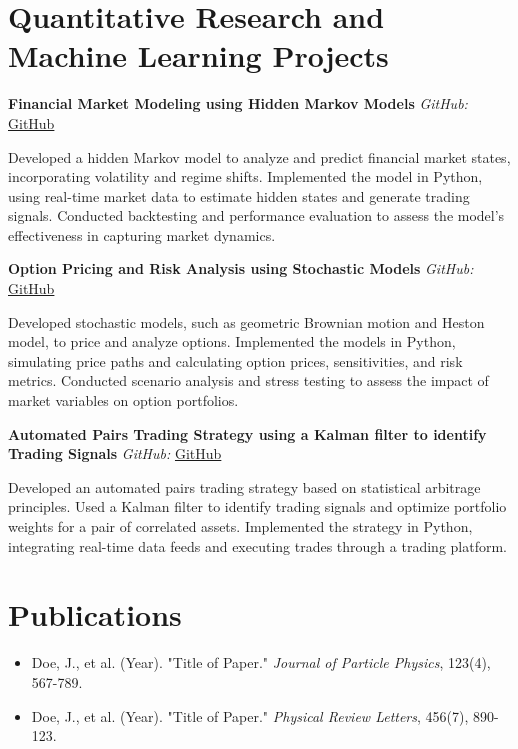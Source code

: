\documentclass[a4paper,10pt]{article}
\begin{document}
\section*{Quantitative Research and Machine Learning Projects}
\textbf{Financial Market Modeling using Hidden Markov Models} \hfill \textit{GitHub:} \href{https://github.com/johndoe/project1}{GitHub}

Developed a hidden Markov model to analyze and predict financial market states, incorporating volatility and regime shifts. Implemented the model in Python, using real-time market data to estimate hidden states and generate trading signals. Conducted backtesting and performance evaluation to assess the model's effectiveness in capturing market dynamics.

\textbf{Option Pricing and Risk Analysis using Stochastic Models} \hfill \textit{GitHub:} \href{https://github.com/johndoe/project2}{GitHub}

Developed stochastic models, such as geometric Brownian motion and Heston model, to price and analyze options. Implemented the models in Python, simulating price paths and calculating option prices, sensitivities, and risk metrics. Conducted scenario analysis and stress testing to assess the impact of market variables on option portfolios.

\textbf{Automated Pairs Trading Strategy using a Kalman filter to identify Trading Signals} \hfill \textit{GitHub:} \href{https://github.com/johndoe/project3}{GitHub}

Developed an automated pairs trading strategy based on statistical arbitrage principles. Used a Kalman filter to identify trading signals and optimize portfolio weights for a pair of correlated assets. Implemented the strategy in Python, integrating real-time data feeds and executing trades through a trading platform.

\section*{Publications}
\begin{itemize}[leftmargin=0.5cm]
  \item Doe, J., et al. (Year). "Title of Paper." \textit{Journal of Particle Physics}, 123(4), 567-789.
  \item Doe, J., et al. (Year). "Title of Paper." \textit{Physical Review Letters}, 456(7), 890-123.
\end{itemize}
\end{document}
